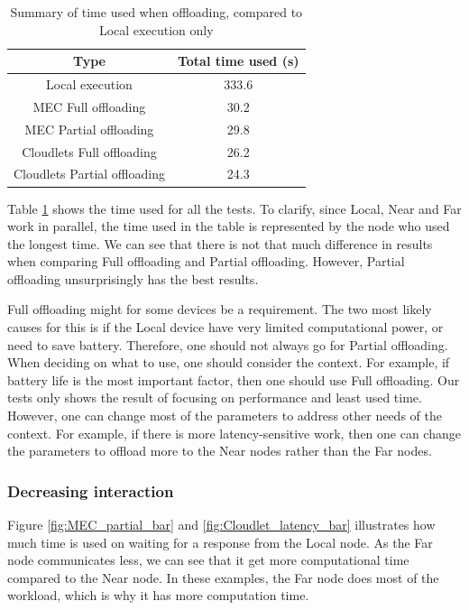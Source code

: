 \begin{table}[]
    \centering
    \begin{tabular}{c|c}

       Type  & Total time used (s)\\
       \hline

       Local execution                         & 333.6  \\

       MEC Full offloading       & 30.2 \\

       MEC Partial offloading    & 29.8 \\

       Cloudlets Full offloading & 26.2 \\
 
       Cloudlets Partial offloading  & 24.3 \\

    \end{tabular}
    \caption{Summary of time used when offloading, compared to Local execution only}
    \label{tab:total_time_compare}
\end{table}
Table \ref{tab:total_time_compare} shows the time used for all the tests. To clarify, since Local, Near and Far work in parallel, the time used in the table is represented by the node who used the longest time. We can see that there is not that much difference in results when comparing Full offloading and Partial offloading. However, Partial offloading unsurprisingly has the best results.

Full offloading might for some devices be a requirement. The two most likely causes for this is if the Local device have very limited computational power, or need to save battery. Therefore, one should not always go for Partial offloading. When deciding on what to use, one should consider the context. For example, if battery life is the most important factor, then one should use Full offloading. Our tests only shows the result of focusing on performance and least used time. However, one can change most of the parameters to address other needs of the context. For example, if there is more latency-sensitive work, then one can change the parameters to offload more to the Near nodes rather than the Far nodes.



\subsubsection{Decreasing interaction}
Figure \ref{fig:MEC_partial_bar} and \ref{fig:Cloudlet_latency_bar} illustrates how much time is used on waiting for a response from the Local node. As the Far node communicates less, we can see that it get more computational time compared to the Near node. In these examples, the Far node does most of the workload, which is why it has more computation time.


